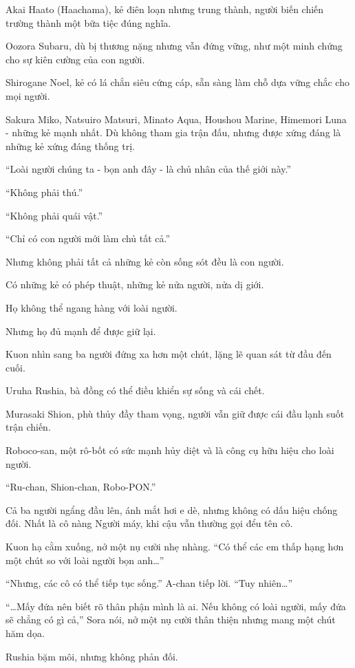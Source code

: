 \documentclass[../main.tex]{subfiles}
\begin{document}
Akai Haato (Haachama), kẻ điên loạn nhưng trung thành, người biến chiến trường thành một bữa tiệc đúng nghĩa.

Oozora Subaru, dù bị thương nặng nhưng vẫn đứng vững, như một minh chứng cho sự kiên cường của con người.

Shirogane Noel, kẻ có lá chắn siêu cứng cáp, sẵn sàng làm chỗ dựa vững chắc cho mọi người.

Sakura Miko, Natsuiro Matsuri, Minato Aqua,  Houshou Marine, Himemori Luna - những kẻ mạnh nhất. Dù không tham gia trận đấu, nhưng được xứng đáng là những kẻ xứng đáng thống trị.

``Loài người chúng ta - bọn anh đây - là chủ nhân của thế giới này.''

``Không phải thú.''

``Không phải quái vật.''

``Chỉ có con người mới làm chủ tất cả.''

Nhưng không phải tất cả những kẻ còn sống sót đều là con người.

Có những kẻ có phép thuật, những kẻ nửa người, nửa dị giới.

Họ không thể ngang hàng với loài người.

Nhưng họ đủ mạnh để được giữ lại.

Kuon nhìn sang ba người đứng xa hơn một chút, lặng lẽ quan sát từ đầu đến cuối.

Uruha Rushia, bà đồng có thể điều khiển sự sống và cái chết.

Murasaki Shion, phù thủy đầy tham vọng, người vẫn giữ được cái đầu lạnh suốt trận chiến.

Roboco-san, một rô-bốt có sức mạnh hủy diệt và là công cụ hữu hiệu cho loài người.

``Ru-chan, Shion-chan, Robo-PON.''

Cả ba người ngẩng đầu lên, ánh mắt hơi e dè, nhưng không có dấu hiệu chống đối. Nhất là cô nàng Người máy, khi cậu vẫn thường gọi đểu tên cô.

Kuon hạ cằm xuống, nở một nụ cười nhẹ nhàng. ``Có thể các em thấp hạng hơn một chút so với loài người bọn anh\dots''

``Nhưng, các cô có thể tiếp tục sống.'' A-chan tiếp lời. ``Tuy nhiên\dots''

``\dots Mấy đứa nên biết rõ thân phận mình là ai. Nếu không có loài người, mấy đứa sẽ chẳng có gì cả,'' Sora nói, nở một nụ cười thân thiện nhưng mang một chút hăm dọa.

Rushia bặm môi, nhưng không phản đối.
\end{document}
